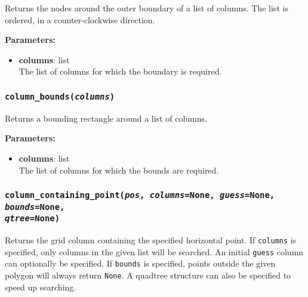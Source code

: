 Returns the nodes around the outer boundary of a list of columns.  The list is ordered, in a counter-clockwise direction.

\textbf{Parameters:}
\begin{itemize}
\item \textbf{columns}: list\\
  The list of columns for which the boundary is required.
\end{itemize}

\begin{snugshade}\subsubsection{\texttt{column\_bounds(\emph{columns})}}\end{snugshade}
\label{sec:mulgrid:column_bounds}

Returns a bounding rectangle around a list of columns.

\textbf{Parameters:}
\begin{itemize}
\item \textbf{columns}: list\\
  The list of columns for which the bounds are required.
\end{itemize}

\begin{snugshade}\subsubsection{\texttt{column\_containing\_point(\emph{pos}, \emph{columns}=None, \emph{guess}=None, \emph{bounds}=None,\\
\emph{qtree}=None)}}\end{snugshade}
\label{sec:mulgrid:column_containing_point}

Returns the grid column containing the specified horizontal point.  If \texttt{columns} is specified, only columns in the given list will be searched.  An initial \texttt{guess} column can optionally be specified.  If \texttt{bounds} is specified, points outside the given polygon will always return \texttt{None}.  A quadtree structure can also be specified to speed up searching.

